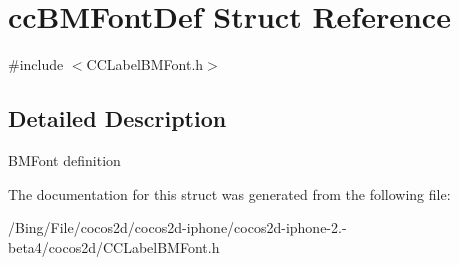 \hypertarget{structcc_b_m_font_def}{\section{cc\-B\-M\-Font\-Def Struct Reference}
\label{structcc_b_m_font_def}
}


{\ttfamily \#include $<$C\-C\-Label\-B\-M\-Font.\-h$>$}



\subsection{Detailed Description}
B\-M\-Font definition 

The documentation for this struct was generated from the following file\-:\begin{DoxyCompactItemize}
\item 
/\-Bing/\-File/cocos2d/cocos2d-\/iphone/cocos2d-\/iphone-\/2.-\/beta4/cocos2d/C\-C\-Label\-B\-M\-Font.\-h\end{DoxyCompactItemize}
